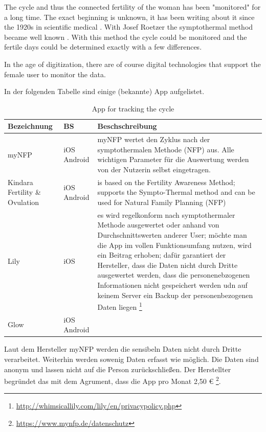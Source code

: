 The cycle and thus the connected fertility of the woman has been "monitored" for a long time. The exact beginning is unknown, it has been writing about it since the 1920s in scientific medical \cite{rotzer1988geschichte}. %
With Josef Roetzer the symptothermal method became well known \cite{roetzer1968erweiterte}. With this method the cycle could be monitored and the fertile days could be determined exactly with a few differences.

In the age of digitization, there are of course digital technologies that support the female user to monitor the data.

In der folgenden Tabelle sind einige (bekannte) App aufgelistet.

\begin{table}
	\caption{App for tracking the cycle}
	\label{tab:typ_of_QR}
	\scriptsize
	\begin{center}
		\begin{tabular}{|p{1.5cm}|p{1cm}|p{4.5cm}|}
			\hline
			Bezeichnung & BS & Beschschreibung \\
			\hline
			\hline
			myNFP &  iOS \newline Android &  myNFP wertet den Zyklus nach der symptothermalen Methode (NFP) aus. Alle wichtigen Parameter für die Auswertung werden von der Nutzerin selbst eingetragen.
			\\
			\hline
			Kindara Fertility \& Ovulation  & iOS \newline Android & is based on the Fertility Awareness Method; supports the Sympto-Thermal method and can be used for Natural Family Planning (NFP) \\
			\hline
			Lily & iOS & es wird regelkonform nach symptothermaler Methode ausgewertet oder anhand von Durchschnittswerten anderer User; möchte man die App im vollen Funktionsumfang nutzen, wird ein Beitrag erhoben; dafür garantiert der Hersteller, dass die Daten nicht durch Dritte ausgewertet werden, dass die personenebzogenen Informationen nicht gespeichert werden udn auf keinem Server ein Backup der personenbezogenen Daten liegen \footnote{\url{http://whimsicallily.com/lily/en/privacypolicy.php}} \\
			\hline
			Glow & iOS \newline Android & \\
			\hline
		\end{tabular}
	\end{center}
\end{table}
Laut dem Hersteller myNFP werden die sensibeln Daten nicht durch Dritte verarbeitet. Weiterhin werden sowenig Daten erfasst wie möglich. Die Daten sind anonym und lassen nicht auf die Person zurückschließen. Der Herstellter begründet das mit dem Agrument, dass die App pro Monat  2,50 \euro{} \footnote{\url{https://www.mynfp.de/datenschutz}}.

